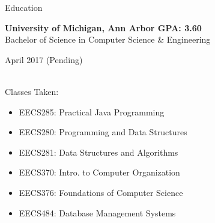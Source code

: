 \documentclass{resume} %
\begin{document}
\bigskip


\begin{rSection}{Education}

{\bf University of Michigan, Ann Arbor \hfill GPA: 3.60 \\}%
Bachelor of Science in Computer Science \& Engineering \hfill \begin{em} April 2017 (Pending) \end{em}\\
Classes Taken:
\vspace{-3mm}
\begin{multicols}{2}
\begin{itemize}[noitemsep,nolistsep]
    \item EECS285: Practical Java Programming
    \item EECS280: Programming and Data Structures
    \item EECS281: Data Structures and Algorithms
    \item EECS370: Intro. to Computer Organization
    \item EECS376: Foundations of Computer Science
    \item EECS484: Database Management Systems
\end{itemize}
\end{multicols}
\vspace{-4mm}

\end{rSection}

\end{document}
